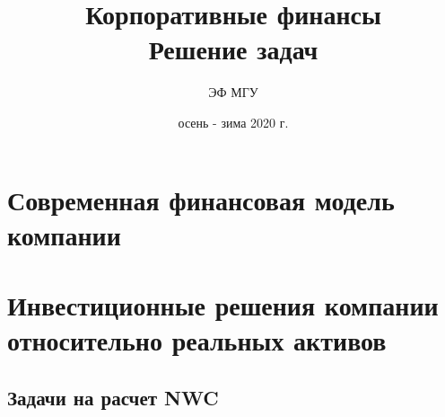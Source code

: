 \documentclass[a4paper, 14pt]{article}
\title{Корпоративные финансы \\ Решение задач}
\author{ЭФ МГУ}
\date{осень - зима 2020 г.}
\theoremstyle{plain} %
\theoremstyle{definition} %
\theoremstyle{remark} %
\begin{document}
\maketitle

\section{Современная финансовая модель компании}

\section{Инвестиционные решения компании относительно реальных активов}
\subsection{Задачи на расчет NWC}
\end{document}
